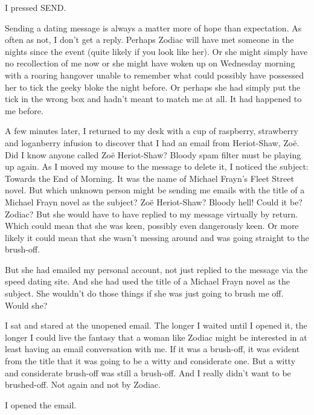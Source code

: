 I pressed {\twelvett SEND}.

Sending a dating message is always a matter more of hope than
expectation. As often as not, I don't get a reply. Perhaps Zodiac
will have met someone in the nights since the event (quite likely if
you look like her). Or she might simply have no recollection of me
now or she might have woken up on Wednesday morning with a roaring
hangover unable to remember what could possibly have possessed her
to tick the geeky bloke the night before. Or perhaps she had simply
put the tick in the wrong box and hadn't meant to match me at all.
It had happened to me before.

A few minutes later, I returned to my desk with a cup of raspberry,
strawberry and loganberry infusion to discover that I had an email
from {\twelvett Heriot-Shaw, Zoë}. Did I know anyone called Zoë
Heriot-Shaw? Bloody spam filter must be playing up again. As I moved my
mouse to the message to delete it, I noticed the subject: {\twelvett
Towards the End of Morning}. It was the name of Michael Frayn's
Fleet Street novel. But which unknown person might be sending me
emails with the title of a Michael Frayn novel as the subject?
Zoë Heriot-Shaw? Bloody hell! Could it be? Zodiac? But she would have
to have replied to my message virtually by return. Which could mean
that she was keen, possibly even dangerously keen. Or more likely it
could mean that she wasn't messing around and was going straight to
the brush-off.

But she had emailed my personal account, not just replied to the
message via the speed dating site. And she had used the title of a
Michael Frayn novel as the subject. She wouldn't do those things if
she was just going to brush me off. Would she?

I sat and stared at the unopened email. The longer I waited until I
opened it, the longer I could live the fantasy that a woman like
Zodiac might be interested in at least having an email conversation
with me. If it was a brush-off, it was evident from the title that
it was going to be a witty and considerate one. But a witty and
considerate brush-off was still a brush-off. And I really didn't
want to be brushed-off. Not again and not by Zodiac.

I opened the email.

